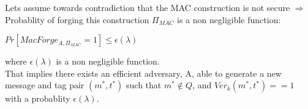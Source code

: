

%

Lets assume towards contradiction that the MAC construction is not secure $\Rightarrow$ Probablity of forging
this construction $\Pi_{MAC}$ is a non negligible function:

\begin{center}
    $Pr[MacForge_{A,\Pi_{MAC}} = 1] \leq \epsilon(\lambda)$
\end{center}
where $\epsilon(\lambda)$ is a non negligible function.\\


That implies there exists an efficient adversary, A, able to generate a new message and tag pair $(m^*, t^*)$
such that $m^* \notin Q $, and $Ver_k(m^*, t^*) == 1$ with a probablity $\epsilon(\lambda)$. 
\newline










